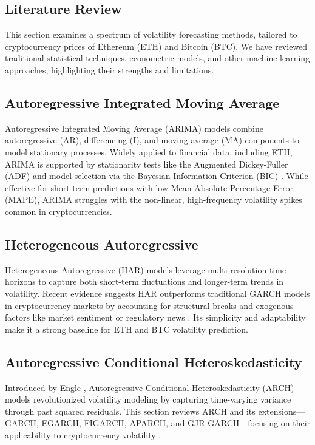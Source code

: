 \documentclass[9pt]{article}
\begin{document}
	\begin{multicols}{2}
		\section{Literature Review}
		\label{sec:litreview}
		
		This section examines a spectrum of volatility forecasting methods, tailored to cryptocurrency prices of Ethereum (ETH) and Bitcoin (BTC). We have reviewed traditional statistical techniques, econometric models, and other machine learning approaches, highlighting their strengths and limitations.
		
		\subsection{Autoregressive Integrated Moving Average}
		Autoregressive Integrated Moving Average (ARIMA) models combine autoregressive (AR), differencing (I), and moving average (MA) components to model stationary processes. Widely applied to financial data, including ETH, ARIMA is supported by stationarity tests like the Augmented Dickey-Fuller (ADF) and model selection via the Bayesian Information Criterion (BIC) \citep{hyndman2018}. While effective for short-term predictions with low Mean Absolute Percentage Error (MAPE), ARIMA struggles with the non-linear, high-frequency volatility spikes common in cryptocurrencies.
		
		\subsection{Heterogeneous Autoregressive}
		Heterogeneous Autoregressive (HAR) models leverage multi-resolution time horizons to capture both short-term fluctuations and longer-term trends in volatility. Recent evidence suggests HAR outperforms traditional GARCH models in cryptocurrency markets by accounting for structural breaks and exogenous factors like market sentiment or regulatory news \citep{clements2021}. Its simplicity and adaptability make it a strong baseline for ETH and BTC volatility prediction.
		
		\subsection{Autoregressive Conditional Heteroskedasticity}
		Introduced by Engle \citep{engle1982}, Autoregressive Conditional Heteroskedasticity (ARCH) models revolutionized volatility modeling by capturing time-varying variance through past squared residuals. This section reviews ARCH and its extensions—GARCH, EGARCH, FIGARCH, APARCH, and GJR-GARCH—focusing on their applicability to cryptocurrency volatility \citep{bollerslev2010}.
		

\end{multicols}
\end{document}
